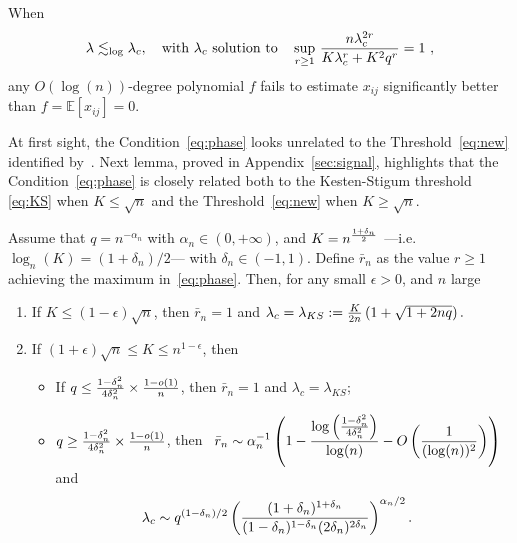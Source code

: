 \documentclass[final]{colt2026}
\newcommand{\1}{\mathbf{1}}
\newcommand{\bbE}{\mathbb{E}}
\newcommand{\pa}[1]{\left(#1\right)}
\newcommand{\ac}[1]{\left\{#1\right\}}
\begin{document}
\begin{theorem}[Informal]\label{thm:informal1}
When %
\vspace{-0.3cm}
\begin{equation}\label{eq:phase}
\lambda\lesssim_{\log} \lambda_{c},\quad \text{with $\lambda_{c}$ solution to}\quad \sup_{r\geq 1}\, {n\lambda_{c}^{2r}\over K\lambda_{c}^{r}+K^2 q^{r}}=1\ ,
\end{equation}
any $O(\log(n))$-degree polynomial $f$ fails to estimate $x_{ij}$ significantly better than $f=\bbE[x_{ij}]=0$.
\end{theorem}

At first sight, the Condition~\eqref{eq:phase} looks unrelated to the Threshold~\eqref{eq:new} identified by~\cite{pmlr-v291-chin25a}. 
Next lemma, proved in Appendix~\ref{sec:signal}, highlights 
 that the Condition~\eqref{eq:phase} is closely related both to the Kesten-Stigum threshold \eqref{eq:KS} when $K\leq \sqrt{n}$ and the Threshold~\eqref{eq:new} when $K\geq \sqrt{n}$.  

\begin{lemma}\label{lem:rstar}
Assume that $q=n^{-\alpha_{n}}$ with $\alpha_{n}\in(0,+\infty)$, and $K=n^{1+\delta_{n}\over 2}$ ---i.e. $\log_{n}(K)=(1+\delta_{n})/2$--- with $\delta_{n}\in(-1,1)$. Define 
$\bar r_{n}$ as the value $r\geq 1$ achieving the maximum in~\eqref{eq:phase}.
Then, for any small $\epsilon>0$, and $n$ large 
\begin{enumerate}
\item If $K\leq (1-\epsilon)\sqrt{n}$, then $\bar r_{n}=1$ and 
$\lambda_{c}=\lambda_{KS}:={K\over 2n} \pa{1+\sqrt{1+2nq}}.$
\item If $(1+\epsilon)\sqrt{n}\leq K\leq n^{1-\epsilon}$, then
\begin{itemize}[wide, labelindent=0pt]
\item If $q\leq {1-\delta_{n}^2\over 4\delta_{n}^2}\times{1-o(1)\over n}$, then $\bar r_{n}=1$ and $\lambda_{c}=\lambda_{KS}$;
\item $q\geq {1-\delta_{n}^2\over 4\delta_{n}^2}\times{1-o(1)\over n}$, then \ 
$\displaystyle{\bar r_{n}\sim \alpha_{n}^{-1} \pa{1-{\log\pa{1-\delta_{n}^2\over 4 \delta_{n}^2}\over \log(n)}-O\pa{1\over (\log (n))^2}}}$ and
\begin{align}\label{eq:lambdac}
\lambda_{c} &\sim q^{(1-\delta_{n})/2} \pa{(1+\delta_{n})^{1+\delta_{n}}\over (1-\delta_{n})^{1-\delta_{n}}(2\delta_{n})^{2\delta_{n}}}^{\alpha_{n}/2}.
\end{align}
\end{itemize}
\end{enumerate}
\end{lemma}
\end{document}
